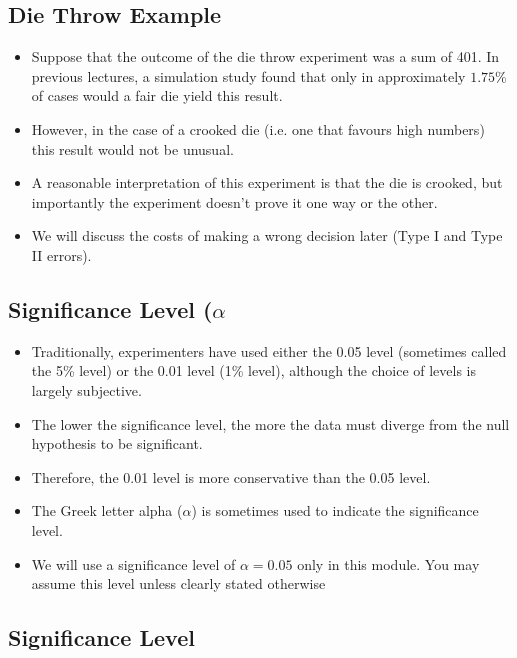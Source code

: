 \documentclass[]{report}
\begin{document}
\subsection*{Die Throw Example}
\begin{itemize}
\item Suppose that the outcome of the die throw experiment was a sum of 401. In previous lectures, a simulation study found that only in approximately $1.75\%$ of cases would a fair die yield this result.
\item However, in the case of a crooked die (i.e. one that favours high numbers) this result would not be unusual.
\item A reasonable interpretation of this experiment is that the die is crooked, but importantly the experiment doesn't prove it one way or the other.
\item We will discuss the costs of making a wrong decision later (Type I and Type II errors).
\end{itemize}


\subsection*{Significance Level ($\alpha$}


\begin{itemize}
\item Traditionally, experimenters have used either the 0.05 level (sometimes called the 5\% level) or the 0.01 level (1\% level), although the choice of levels is largely subjective.  \item The lower the significance level, the more the data must diverge from the null hypothesis to be significant. \item Therefore, the 0.01 level is more conservative than the 0.05 level. \item The Greek letter alpha ($\alpha$) is sometimes used to indicate the significance level. \item We will use a significance level of $\alpha =0.05$ only in this module. You may assume this level unless clearly stated otherwise
\end{itemize}
\subsection{Significance Level}
\end{document}

